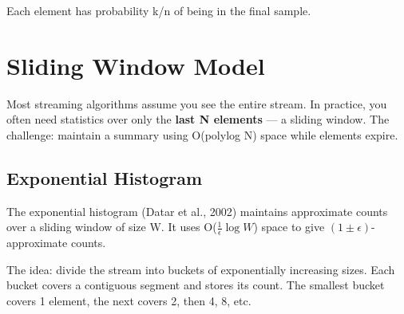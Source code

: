 Each element has probability k/n of being in the final sample.

\section{Sliding Window Model}

Most streaming algorithms assume you see the entire stream. In practice, you often need statistics over only the \textbf{last N elements} — a sliding window. The challenge: maintain a summary using O(polylog N) space while elements expire.

\subsection{Exponential Histogram}

The exponential histogram (Datar et al., 2002) maintains approximate counts over a sliding window of size W. It uses O($\frac{1}{\epsilon} \log W$) space to give $(1 \pm \epsilon)$-approximate counts.

The idea: divide the stream into buckets of exponentially increasing sizes. Each bucket covers a contiguous segment and stores its count. The smallest bucket covers 1 element, the next covers 2, then 4, 8, etc.

